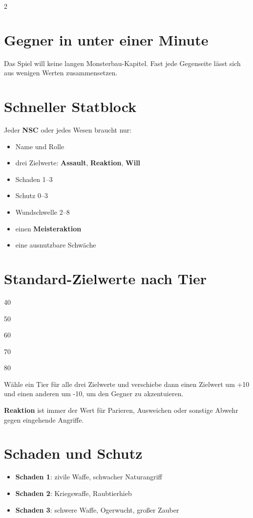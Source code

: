\label{ch:spielleitung}

\begin{multicols*}{2}
\section{Gegner in unter einer Minute}
Das Spiel will keine langen Monsterbau-Kapitel. Fast jede Gegenseite lässt sich aus wenigen Werten zusammensetzen.

\section{Schneller Statblock}
Jeder \textbf{NSC} oder jedes Wesen braucht nur:
\begin{itemize}[leftmargin=*]
\item Name und Rolle
\item drei Zielwerte: \textbf{Assault}, \textbf{Reaktion}, \textbf{Will}
\item Schaden 1--3
\item Schutz 0--3
\item Wundschwelle 2--8
\item einen \textbf{Meisteraktion}
\item eine ausnutzbare Schwäche
\end{itemize}

\section{Standard-Zielwerte nach Tier}
\begin{description}[style=nextline,leftmargin=0pt]
\item[\textbf{Frail}] 40
\item[\textbf{Trained}] 50
\item[\textbf{Veteran}] 60
\item[\textbf{Elite}] 70
\item[\textbf{Monstrous}] 80
\end{description}

Wähle ein Tier für alle drei Zielwerte und verschiebe dann einen Zielwert um +10 und einen anderen um -10, um den Gegner zu akzentuieren.

\textbf{Reaktion} ist immer der Wert für Parieren, Ausweichen oder sonstige Abwehr gegen eingehende Angriffe.

\section{Schaden und Schutz}
\begin{itemize}[leftmargin=*]
\item \textbf{Schaden 1}: zivile Waffe, schwacher Naturangriff
\item \textbf{Schaden 2}: Kriegswaffe, Raubtierhieb
\item \textbf{Schaden 3}: schwere Waffe, Ogerwucht, großer Zauber
\end{itemize}


\end{multicols*}
